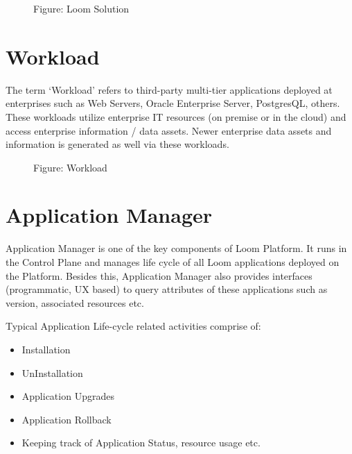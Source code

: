 \documentclass[letterpaper,10pt,english]{sphinxmanual}
\begin{document}
\begin{figure}[htbp]
\centering
\capstart

\noindent{}
\caption{Figure: Loom Solution}\label{\detokenize{mcdmp_concepts:id14}}\end{figure}


\section{Workload}
\label{\detokenize{mcdmp_concepts:workload}}
The term ‘Workload’ refers to third-party multi-tier applications deployed at enterprises such as Web Servers, Oracle Enterprise Server, PostgresQL, others.  These workloads utilize enterprise IT resources (on premise or in the cloud) and access enterprise information / data assets.  Newer enterprise data assets and information is generated as well via these workloads.

\begin{figure}[htbp]
\centering
\capstart

\noindent{}
\caption{Figure: Workload}\label{\detokenize{mcdmp_concepts:id15}}\end{figure}


\section{Application Manager}
\label{\detokenize{mcdmp_concepts:application-manager}}
Application Manager is one of the key components of Loom Platform. It runs in the Control Plane and manages life cycle of all Loom applications deployed on the Platform.  Besides this, Application Manager also provides interfaces (programmatic, UX based) to query attributes of these applications such as version, associated resources etc.

Typical Application Life-cycle related activities comprise of:
\begin{itemize}
\item {} 
Installation

\item {} 
UnInstallation

\item {} 
Application Upgrades

\item {} 
Application Rollback

\item {} 
Keeping track of Application Status, resource usage etc.

\end{itemize}
\end{document}
